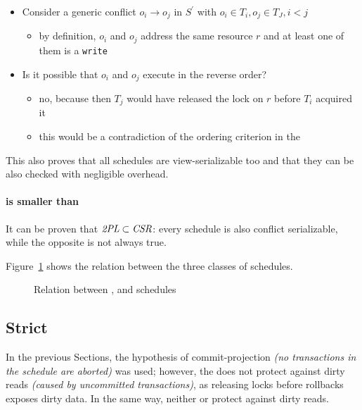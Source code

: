 \documentclass[english]{article}
\begin{document}
\begin{itemize}
  \item Consider a generic conflict \(o_i \rightarrow o_j\) in \(S^\prime\) with \(o_i \in T_i, o_j \in T_J, i < j\)
        \begin{itemize}
          \item by definition, \(o_i\) and \(o_j\) address the same resource \(r\) and at least one of them is a \texttt{write}
        \end{itemize}
  \item Is it possible that \(o_i\) and \(o_j\) execute in the reverse order?
        \begin{itemize}
          \item no, because then \(T_j\) would have released the lock on \(r\) before \(T_i\) acquired it
          \item this would be a contradiction of the ordering criterion in the \TPL
        \end{itemize}
\end{itemize}

\bigskip
This also proves that all \TPL schedules are view-serializable too and that they can be also checked with negligible overhead.

\paragraph{\TPL is smaller than \CSR}

It can be proven that \(\textit{2PL} \subset \textit{CSR}\): every \TPL schedule is also conflict serializable, while the opposite is not always true.

\bigskip
Figure~\ref{fig:relation-between-tpl-csr-vsr-schedules} shows the relation between the three classes of schedules.

\begin{figure}[htbp]
  \centering
  \bigskip
  \caption{Relation between \TPL, \CSR and \VSR schedules}
  \label{fig:relation-between-tpl-csr-vsr-schedules}
  \bigskip
\end{figure}

\subsection{Strict \TPL}

In the previous Sections, the hypothesis of commit-projection \textit{(no transactions in the schedule are aborted)} was used;
however, the \TPL does not protect against dirty reads \textit{(caused by uncommitted transactions)}, as releasing locks before rollbacks exposes dirty data.
In the same way, neither \VSR or \CSR protect against dirty reads.
\end{document}
